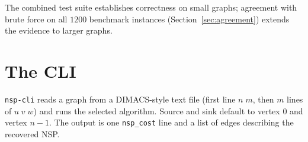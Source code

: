 The combined test suite establishes correctness on small graphs;
agreement with brute force on all $1200$ benchmark instances
(Section~\ref{sec:agreement}) extends the evidence to larger graphs.

\section{The CLI}

\texttt{nsp-cli} reads a graph from a DIMACS-style text file (first line
$n\;m$, then $m$ lines of $u\;v\;w$) and runs the selected algorithm.
Source and sink default to vertex $0$ and vertex $n-1$. The output is
one \texttt{nsp\_cost} line and a list of edges describing the recovered
NSP.

